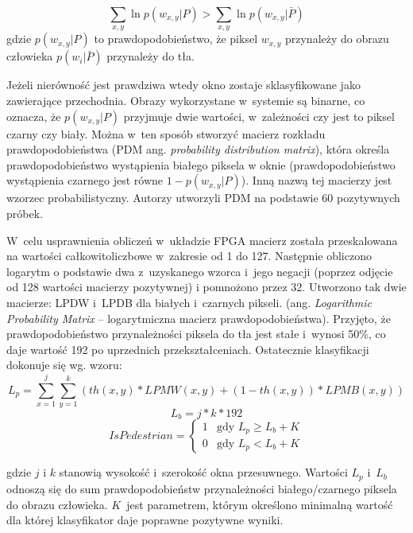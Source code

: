 \begin{equation} \label{eq:bayes_china}
\sum_{x,y} \ln p(w_{x,y}|P) > \sum_{x,y} \ln p(w_{x,y}|\bar{P})
\end{equation}
\noindent gdzie \( p(w_{x,y}|P) \) to prawdopodobieństwo, że piksel $w_{x,y}$ przynależy do obrazu człowieka
\( p(w_i|\bar{P}) \) przynależy do tła.

Jeżeli nierówność jest prawdziwa wtedy okno zostaje sklasyfikowane jako zawierające przechodnia.
Obrazy wykorzystane w~systemie są binarne, co oznacza, że \( p(w_{x,y}|P) \) przyjmuje dwie wartości, w~zależności czy jest to piksel czarny czy biały. 
Można w~ten sposób stworzyć macierz rozkładu prawdopodobieństwa (PDM ang. \textit{probability distribution matrix}), która określa prawdopodobieństwo wystąpienia białego piksela w oknie (prawdopodobieństwo wystąpienia czarnego jest równe \(1- p(w_{x,y}|P) \)). 
Inną nazwą tej macierzy jest wzorzec probabilistyczny.
Autorzy utworzyli PDM na podstawie 60 pozytywnych próbek.

W~celu usprawnienia obliczeń w~układzie FPGA macierz została przeskalowana na wartości całkowitoliczbowe w~zakresie od 1 do 127.
Następnie obliczono logarytm o podstawie dwa z~uzyskanego wzorca i~jego negacji (poprzez odjęcie od 128 wartości macierzy pozytywnej) i pomnożono przez 32.
Utworzono tak dwie macierze: LPDW i~LPDB dla białych i~czarnych pikseli. (ang. \textit{Logarithmic Probability Matrix} – logarytmiczna macierz prawdopodobieństwa).
Przyjęto, że prawdopodobieństwo przynależności piksela do tła jest stałe i~wynosi 50\%, co daje wartość 192 po uprzednich przekształceniach.
Ostatecznie klasyfikacji dokonuje się wg. wzoru:
\begin{equation}\label{equ:Lp}
L_{p} = \sum_{x=1}^{j}\sum_{y=1}^{k}(th(x,y)*LPMW(x,y)+(1-th(x,y))*LPMB(x,y))
\end{equation}
\begin{equation}\label{equ:Lb}
L_{b} = j*k*192
\end{equation}
\begin{equation} \label{equ:ispedistant}
IsPedestrian = \left\{ \begin{array}{ll}
1 & \textrm{gdy $L_{p} \geq L_{b} + K$}\\
0 & \textrm{gdy $L_{p}<L_{b} + K$}
\end{array} \right.
\end{equation}

\noindent gdzie $j$ i $k$ stanowią wysokość i~szerokość okna przesuwnego. 
Wartości $L_p$ i~$L_b$ odnoszą się do sum prawdopodobieństw przynależności białego/czarnego piksela do obrazu człowieka. 
$K$~jest parametrem, którym określono minimalną wartość dla której klasyfikator daje poprawne pozytywne wyniki.

